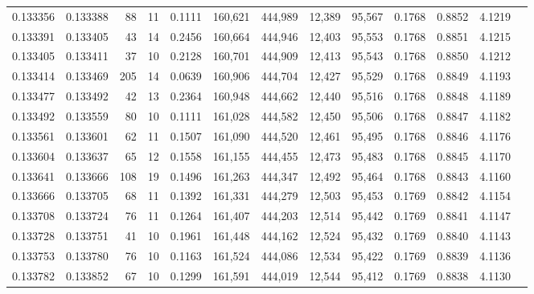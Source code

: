\begin{tabular}{rrrrrrrrrrrrr}
0.133356 & 0.133388 &    88 &  11 &                                     0.1111 & 160,621 & 444,989 &  12,389 &  95,567 & 0.1768 & 0.8852 & 4.1219 \\
0.133391 & 0.133405 &    43 &  14 &                                     0.2456 & 160,664 & 444,946 &  12,403 &  95,553 & 0.1768 & 0.8851 & 4.1215 \\
0.133405 & 0.133411 &    37 &  10 &                                     0.2128 & 160,701 & 444,909 &  12,413 &  95,543 & 0.1768 & 0.8850 & 4.1212 \\
0.133414 & 0.133469 &   205 &  14 &                                     0.0639 & 160,906 & 444,704 &  12,427 &  95,529 & 0.1768 & 0.8849 & 4.1193 \\
0.133477 & 0.133492 &    42 &  13 &                                     0.2364 & 160,948 & 444,662 &  12,440 &  95,516 & 0.1768 & 0.8848 & 4.1189 \\
0.133492 & 0.133559 &    80 &  10 &                                     0.1111 & 161,028 & 444,582 &  12,450 &  95,506 & 0.1768 & 0.8847 & 4.1182 \\
0.133561 & 0.133601 &    62 &  11 &                                     0.1507 & 161,090 & 444,520 &  12,461 &  95,495 & 0.1768 & 0.8846 & 4.1176 \\
0.133604 & 0.133637 &    65 &  12 &                                     0.1558 & 161,155 & 444,455 &  12,473 &  95,483 & 0.1768 & 0.8845 & 4.1170 \\
0.133641 & 0.133666 &   108 &  19 &                                     0.1496 & 161,263 & 444,347 &  12,492 &  95,464 & 0.1768 & 0.8843 & 4.1160 \\
0.133666 & 0.133705 &    68 &  11 &                                     0.1392 & 161,331 & 444,279 &  12,503 &  95,453 & 0.1769 & 0.8842 & 4.1154 \\
0.133708 & 0.133724 &    76 &  11 &                                     0.1264 & 161,407 & 444,203 &  12,514 &  95,442 & 0.1769 & 0.8841 & 4.1147 \\
0.133728 & 0.133751 &    41 &  10 &                                     0.1961 & 161,448 & 444,162 &  12,524 &  95,432 & 0.1769 & 0.8840 & 4.1143 \\
0.133753 & 0.133780 &    76 &  10 &                                     0.1163 & 161,524 & 444,086 &  12,534 &  95,422 & 0.1769 & 0.8839 & 4.1136 \\
0.133782 & 0.133852 &    67 &  10 &                                     0.1299 & 161,591 & 444,019 &  12,544 &  95,412 & 0.1769 & 0.8838 & 4.1130 \\

\end{tabular}
